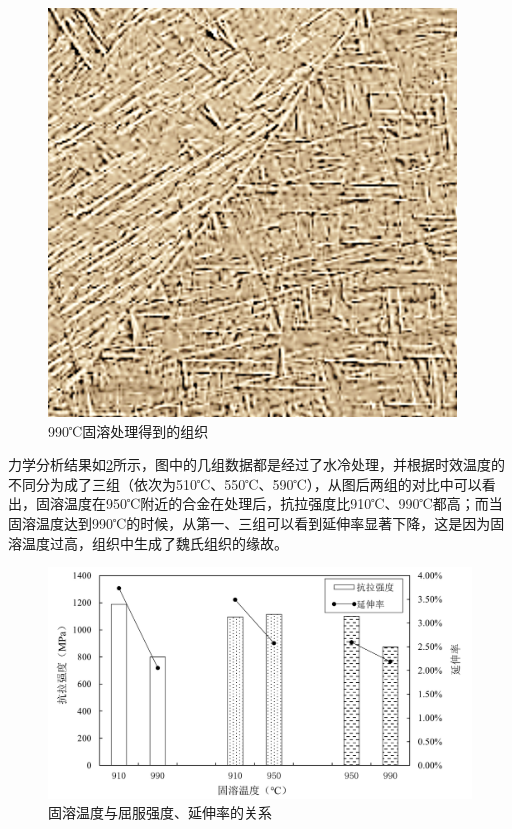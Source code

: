 \begin{figure}[htbp]
{		\begin{minipage}[t]{0.33\linewidth}
			\centering
			\includegraphics[width=0.8\linewidth]{pic/组织分析/990+590}
		\end{minipage}
	}%
	\centering
	\caption{990℃固溶处理得到的组织}
	\label{fig:990c}
\end{figure}

力学分析结果如\ref{fig:Gqy}所示，图中的几组数据都是经过了水冷处理，并根据时效温度的不同分为成了三组（依次为510℃、550℃、590℃），从图后两组的对比中可以看出，固溶温度在950℃附近的合金在处理后，抗拉强度比910℃、990℃都高；而当固溶温度达到990℃的时候，从第一、三组可以看到延伸率显著下降，这是因为固溶温度过高，组织中生成了魏氏组织的缘故。


\begin{figure}[h!]
	\centering
	\includegraphics[width=1\linewidth]{pic/固溶温度与屈服强度、延伸率的关系}
	\caption{固溶温度与屈服强度、延伸率的关系}
	\label{fig:Gqy}
\end{figure}

